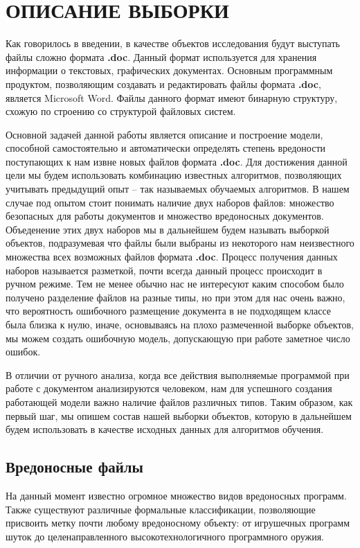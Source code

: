 \chapter{ОПИСАНИЕ ВЫБОРКИ}

Как говорилось в введении, в качестве объектов исследования будут выступать файлы сложно формата \textbf{.doc}.
Данный формат используется для хранения информации о текстовых, графических документах.
Основным программным продуктом, позволяющим создавать и редактировать файлы формата \textbf{.doc}, является Microsoft Word.
Файлы данного формат имеют бинарную структуру, схожую по строению со структурой файловых систем. \cite{doc_format}

Основной задачей данной работы является описание и построение модели, способной самостоятельно и автоматически определять степень вредоности поступающих к нам извне новых файлов формата \textbf{.doc}.
Для достижения данной цели мы будем использовать комбинацию известных алгоритмов, позволяющих учитывать предыдущий опыт -- так называемых обучаемых алгоритмов.
В нашем случае под опытом стоит понимать наличие двух наборов файлов: множество безопасных для работы документов и множество вредоносных документов.
Объеденение этих двух наборов мы в дальнейшем будем называть выборкой объектов, подразумевая что файлы были выбраны из некоторого нам неизвестного множества всех возможных файлов формата \textbf{.doc}. 
Процесс получения данных наборов называется разметкой, почти всегда данный процесс происходит в ручном режиме.
Тем не менее обычно нас не интересуют каким способом было получено разделение файлов на разные типы, но при этом для нас очень важно, что вероятность ошибочного размещение документа в не подходящем классе была близка к нулю, иначе, основываясь на плохо размеченной выборке объектов, мы можем создать ошибочную модель, допускающую при работе заметное число ошибок.

В отличии от ручного анализа, когда все действия выполняемые программой при работе с документом анализируются человеком, нам для успешного создания работающей модели важно наличие файлов различных типов.
Таким образом, как первый шаг, мы опишем состав нашей выборки объектов, которую в дальнейшем будем использовать в качестве исходных данных для алгоритмов обучения.

\section{Вредоносные файлы}

На данный момент известно огромное множество видов вредоносных программ.
Также существуют различные формальные классификации, позволяющие присвоить метку почти любому вредоносному объекту: от игрушечных программ шуток до целенаправленного высокотехнологичного программного оружия.

